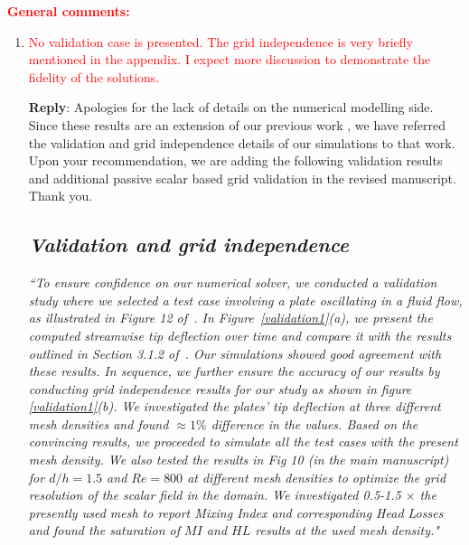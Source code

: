 \documentclass[onecolumn,a4paper,amsmath,amssym,pre]{revtex4}
\begin{document}
{\textcolor{red}{\textbf{General comments:}}\\


\begin{enumerate}
\item \textcolor{red}{No validation case is presented. The grid independence is very briefly mentioned in the appendix. I expect more discussion to demonstrate the fidelity of the solutions.}

\textbf{Reply}: Apologies for the lack of details on the numerical modelling side. Since these results are an extension of our previous work \cite{Self2019}, we have referred the validation and grid independence details of our simulations to that work. Upon your recommendation, we are adding the following validation results and additional passive scalar based grid validation in the revised manuscript. Thank you.

\subsection*{\textit{Validation and grid independence}} \textit{``To ensure confidence on our numerical solver, we conducted a validation study where we selected a test case involving a plate oscillating in a fluid flow, as illustrated in Figure 12 of~\cite{Gluck2001}. In Figure~\ref{validation1}(a), we present the computed streamwise tip deflection over time and compare it with the results outlined in Section 3.1.2 of~\cite{Gluck2001}. Our simulations showed good agreement with these results. In sequence, we further ensure the accuracy of our results by conducting grid independence results for our study as shown in figure \ref{validation1}(b). We investigated the plates' tip deflection at three different mesh densities and found $\approx1\%$ difference in the values. Based on the convincing results, we proceeded to simulate all the test cases with the present mesh density. We also tested the results in Fig 10 (in the main manuscript) for $d/h=1.5$ and $Re=800$ at different mesh densities to optimize the grid resolution of the scalar field in the domain. We investigated 0.5-1.5 $\times$ the presently used mesh to report Mixing Index and corresponding Head Losses and found the saturation of $MI$ and $HL$ results at the used mesh density."}


\end{enumerate}}
\end{document}
